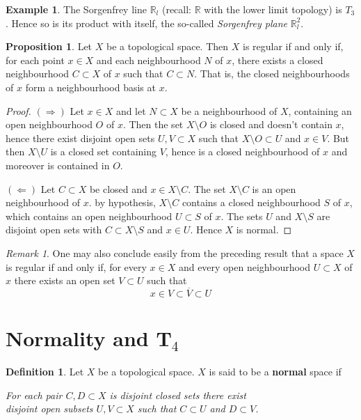 \documentclass{book}
\theoremstyle{definition}
\newtheorem{proposition}{Proposition}[section]
\newtheorem{definition}{Definition}[section]
\newtheorem{example}{Example}[section]
\theoremstyle{remark}
\newtheorem{remark}{Remark}[section]
\newcommand{\R}{\mathbb{R}}
\begin{document}
\begin{example}
\label{sorgenfreyplane}
The Sorgenfrey line $\R_l$ (recall: $\R$ with the lower limit topology) is $T_3$. Hence so is its product with itself, the so-called \textit{Sorgenfrey plane} $\R^2_l$.
\end{example}

\begin{proposition}
\label{regularinclusion}
Let $X$ be a topological space. Then $X$ is regular if and only if, for each point $x\in X$ and each neighbourhood $N$ of $x$, there exists a closed neighbourhood $C\subset X$ of $x$ such that $C\subset N$. That is, the closed neighbourhoods of $x$ form a neighbourhood basis at $x$.
\end{proposition}
\begin{proof}
$(\Rightarrow)$ Let $x\in X$ and let $N\subset X$ be a neighbourhood of $X$, containing an open neighbourhood $O$ of $x$. Then the set $X\setminus O$ is closed and doesn't contain $x$, hence there exist disjoint open sets $U,V\subset X$ such that $X\setminus O\subset U$ and $x\in V$. But then $X\setminus U$ is a closed set containing $V$, hence is a closed neighbourhood of $x$ and moreover is contained in $O$.

$(\Leftarrow)$ Let $C\subset X$ be closed and $x\in X\setminus C$. The set $X\setminus C$ is an open neighbourhood of $x$. by hypothesis, $X\setminus C$ contains a closed neighbourhood $S$ of $x$, which contains an open neighbourhood $U\subset S$ of $x$. The sets $U$ and $X\setminus S$ are disjoint open sets with $C\subset X\setminus S$ and $x\in U$. Hence $X$ is normal.
\end{proof}

\begin{remark}
One may also conclude easily from the preceding result that a space $X$ is regular if and only if, for every $x\in X$ and every open neighbourhood $U\subset X$ of $x$ there exists an open set $V\subset U$ such that
$$x\in V\subset \overline V\subset U$$
\end{remark}

\section{Normality and T$_4$}
\begin{definition}
Let $X$ be a topological space. $X$ is said to be a \textbf{normal} space if
\begin{center}
    \textit{For each pair $C,D\subset X$ is disjoint closed sets there exist\\ disjoint open subsets $U,V\subset X$ such that $C\subset U$ and $D\subset V$.}
\end{center}
\end{definition}
\end{document}
